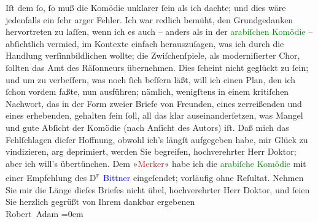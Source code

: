                     Iſt dem ſo, ſo muß die Komödie unklarer ſein als ich dachte; und dies wäre
                    jedenfalls ein ſehr arger Fehler. Ich war redlich bemüht, den Grundgedanken
                    hervortreten zu laſſen, {\pb}wenn ich es auch –
                    anders als in der \textcolor{green}{arabiſchen
                        Komödie}{} – abſichtlich vermied, im Kontexte einfach herauszuſagen, was
                    ich durch die Handlung verſinnbildlichen wollte; die Zwiſchenſpiele, als
                    moderniſierter Chor, ſollten das Amt des Räſonneurs übernehmen.\pend
           \pstart
           Dies ſcheint nicht geglückt zu ſein; und um zu verbeſſern, was noch ſich beſſern
                    läßt, will ich einen Plan, den ich ſchon vordem faßte, nun ausführen; nämlich,
                    wenigſtens in einem kritiſchen Nachwort, das in der Form zweier Briefe von
                    Freunden, eines zerreißenden und eines erhebenden, {\pb}gehalten ſein ſoll, all das klar
                    auseinanderſetzen, was Mangel und gute Abſicht der Komödie (nach Anſicht des
                    Autors) iſt.\pend
           \pstart
           Daß mich das Fehlſchlagen dieſer Hoffnung, obwohl ich’s längſt aufgegeben habe,
                    mir Glück zu vindizieren, arg deprimiert, werden Sie begreifen, hochverehrter
                    Herr Doktor; aber ich will’s übertünchen.\pend
           \pstart
           Dem »\textcolor{brown}{Merker}{}\ledrightnote{\textcolor{brown}{Der Merker}}« habe ich die \textcolor{green}{arabiſche Komödie}{}\ledrightnote{\textcolor{green}{Die Geschichte des Alî ibn Bekkâr mit Schams an-Nahâr}} mit einer Empfehlung des D\textsuperscript{r} \textcolor{blue}{Bittner}{}\ledrightnote{\textcolor{blue}{Julius Bittner}}
                    eingeſendet; vorläufig ohne Reſultat.\pend
           \pstart
           Nehmen Sie mir die Länge dieſes Briefes nicht übel, hochverehrter Herr Doktor,
                    und ſeien Sie herzlich gegrüßt von Ihrem\pend
           \pstart
           dankbar ergebenen{\\[\baselineskip]}\spacefill\mbox{Robert Adam}\pend
           \leftskip=0em{}\endnumbering{}  
      